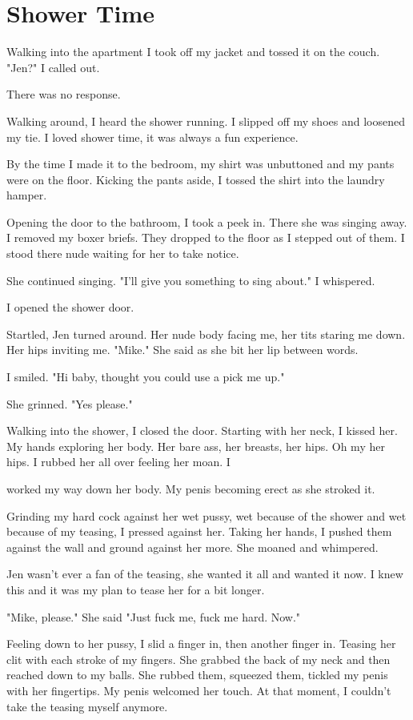 \section{Shower Time}

Walking into the apartment I took off my jacket and tossed it on the couch. "Jen?" I called out.

There was no response.

Walking around, I heard the shower running. I slipped off my shoes and loosened my tie. I loved shower time, it was always a fun experience.

By the time I made it to the bedroom, my shirt was unbuttoned and my pants were on the floor. Kicking the pants aside, I tossed the shirt into the laundry hamper.

Opening the door to the bathroom, I took a peek in. There she was singing away. I removed my boxer briefs. They dropped to the floor as I stepped out of them. I stood there nude waiting for her to take notice.

She continued singing. "I'll give you something to sing about." I whispered.

I opened the shower door.

Startled, Jen turned around. Her nude body facing me, her tits staring me down. Her hips inviting me. "Mike." She said as she bit her lip between words.

I smiled. "Hi baby, thought you could use a pick me up."

She grinned. "Yes please."

Walking into the shower, I closed the door. Starting with her neck, I kissed her. My hands exploring her body. Her bare ass, her breasts, her hips. Oh my her hips. I rubbed her all over feeling her moan. I

worked my way down her body. My penis becoming erect as she stroked it.

Grinding my hard cock against her wet pussy, wet because of the shower and wet because of my teasing, I pressed against her. Taking her hands, I pushed them against the wall and ground against her more. She moaned and whimpered.

Jen wasn't ever a fan of the teasing, she wanted it all and wanted it now. I knew this and it was my plan to tease her for a bit longer.

"Mike, please." She said "Just fuck me, fuck me hard. Now."

Feeling down to her pussy, I slid a finger in, then another finger in. Teasing her clit with each stroke of my fingers. She grabbed the back of my neck and then reached down to my balls. She rubbed them, squeezed them, tickled my penis with her fingertips. My penis welcomed her touch. At that moment, I couldn't take the teasing myself anymore.

